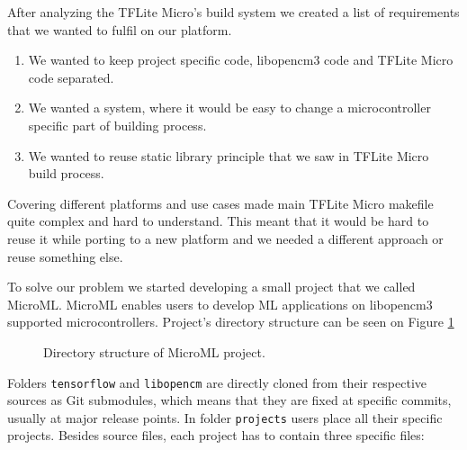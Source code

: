 After analyzing the TFLite Micro's build system we created a list of requirements that we wanted to fulfil on our platform.

\begin{enumerate}
    \item We wanted to keep project specific code, libopencm3 code and TFLite Micro code separated.
    \item We wanted a system, where it would be easy to change a microcontroller specific part of building process.
    \item We wanted to reuse static library principle that we saw in TFLite Micro build process.
\end{enumerate}

Covering different platforms and use cases made main TFLite Micro makefile quite complex and hard to understand.
This meant that it would be hard to reuse it while porting to a new platform and we needed a different approach or reuse something else.

To solve our problem we started developing a small project that we called MicroML\footnotemark.
MicroML enables users to develop ML applications on libopencm3 supported microcontrollers.
Project's directory structure can be seen on Figure \ref{microml_dir}


\begin{figure}[ht] 
    \centering
    \begin{minipage}{7cm}
    \end{minipage}
    \caption{ Directory structure of MicroML project.}
    \label{microml_dir}
\end{figure}

Folders \verb|tensorflow| and \verb|libopencm| are directly cloned from their respective sources as Git submodules, which means that they are fixed at specific commits, usually at major release points.
In folder \verb|projects| users place all their specific projects.
Besides source files, each project has to contain three specific files:

